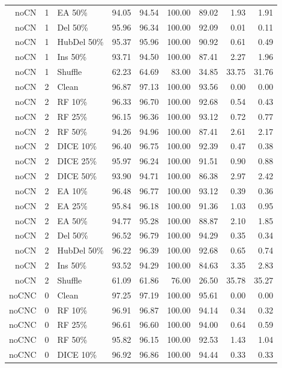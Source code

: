 {\begin{longtable}{rllrrrrrr}
noCN & 1 & EA 50\% & 94.05 & 94.54 & 100.00 & 89.02 & 1.93 & 1.91 \\
noCN & 1 & Del 50\% & 95.96 & 96.34 & 100.00 & 92.09 & 0.01 & 0.11 \\
noCN & 1 & HubDel 50\% & 95.37 & 95.96 & 100.00 & 90.92 & 0.61 & 0.49 \\
noCN & 1 & Ins 50\% & 93.71 & 94.50 & 100.00 & 87.41 & 2.27 & 1.96 \\
noCN & 1 & Shuffle & 62.23 & 64.69 & 83.00 & 34.85 & 33.75 & 31.76 \\
noCN & 2 & Clean & 96.87 & 97.13 & 100.00 & 93.56 & 0.00 & 0.00 \\
noCN & 2 & RF 10\% & 96.33 & 96.70 & 100.00 & 92.68 & 0.54 & 0.43 \\
noCN & 2 & RF 25\% & 96.15 & 96.36 & 100.00 & 93.12 & 0.72 & 0.77 \\
noCN & 2 & RF 50\% & 94.26 & 94.96 & 100.00 & 87.41 & 2.61 & 2.17 \\
noCN & 2 & DICE 10\% & 96.40 & 96.75 & 100.00 & 92.39 & 0.47 & 0.38 \\
noCN & 2 & DICE 25\% & 95.97 & 96.24 & 100.00 & 91.51 & 0.90 & 0.88 \\
noCN & 2 & DICE 50\% & 93.90 & 94.71 & 100.00 & 86.38 & 2.97 & 2.42 \\
noCN & 2 & EA 10\% & 96.48 & 96.77 & 100.00 & 93.12 & 0.39 & 0.36 \\
noCN & 2 & EA 25\% & 95.84 & 96.18 & 100.00 & 91.36 & 1.03 & 0.95 \\
noCN & 2 & EA 50\% & 94.77 & 95.28 & 100.00 & 88.87 & 2.10 & 1.85 \\
noCN & 2 & Del 50\% & 96.52 & 96.79 & 100.00 & 94.29 & 0.35 & 0.34 \\
noCN & 2 & HubDel 50\% & 96.22 & 96.39 & 100.00 & 92.68 & 0.65 & 0.74 \\
noCN & 2 & Ins 50\% & 93.52 & 94.29 & 100.00 & 84.63 & 3.35 & 2.83 \\
noCN & 2 & Shuffle & 61.09 & 61.86 & 76.00 & 26.50 & 35.78 & 35.27 \\
noCNC & 0 & Clean & 97.25 & 97.19 & 100.00 & 95.61 & 0.00 & 0.00 \\
noCNC & 0 & RF 10\% & 96.91 & 96.87 & 100.00 & 94.14 & 0.34 & 0.32 \\
noCNC & 0 & RF 25\% & 96.61 & 96.60 & 100.00 & 94.00 & 0.64 & 0.59 \\
noCNC & 0 & RF 50\% & 95.82 & 96.15 & 100.00 & 92.53 & 1.43 & 1.04 \\
noCNC & 0 & DICE 10\% & 96.92 & 96.86 & 100.00 & 94.44 & 0.33 & 0.33 \\

\end{longtable}}
